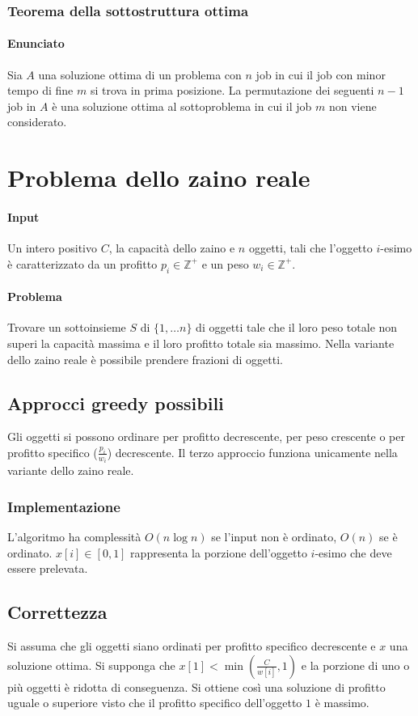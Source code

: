 \subsubsection{Teorema della sottostruttura ottima}
\paragraph{Enunciato}
Sia $A$ una soluzione ottima di un problema con $n$ job in cui il job con minor tempo di fine $m$ si trova in prima posizione. La permutazione dei seguenti $n-1$ job in $A$ \`e una
soluzione ottima al sottoproblema in cui il job $m$ non viene considerato. 
\section{Problema dello zaino reale}
\paragraph{Input}
Un intero positivo $C$, la capacit\`a dello zaino e $n$ oggetti, tali che l'oggetto $i$-esimo \`e caratterizzato da un profitto $p_i\in\mathbb{Z}^+$ e un peso $w_i\in\mathbb{Z}^+$.
\paragraph{Problema}
Trovare un sottoinsieme $S$ di $\{1,\dots n\}$ di oggetti tale che il loro peso totale non superi la capacit\`a massima e il loro profitto totale sia massimo. Nella variante dello zaino
reale \`e possibile prendere frazioni di oggetti.
\subsection{Approcci greedy possibili}
Gli oggetti si possono ordinare per profitto decrescente, per peso crescente o per profitto specifico ($\frac{p_i}{w_i}$) decrescente. Il terzo approccio funziona unicamente nella
variante dello zaino reale.
\subsubsection{Implementazione}

L'algoritmo ha complessit\`a $O(n\log n)$ se l'input non \`e ordinato, $O(n)$ se \`e ordinato. $x[i]\in[0, 1]$ rappresenta la porzione dell'oggetto $i$-esimo che deve essere 
prelevata.
\subsection{Correttezza}
Si assuma che gli oggetti siano ordinati per profitto specifico decrescente e $x$ una soluzione ottima. Si supponga che $x[1] < \min(\frac{C}{w[i]}, 1)$ e la porzione di uno o pi\`u
oggetti \`e ridotta di conseguenza. Si ottiene cos\`i una soluzione di profitto uguale o superiore visto che il profitto specifico dell'oggetto $1$ \`e massimo. 
